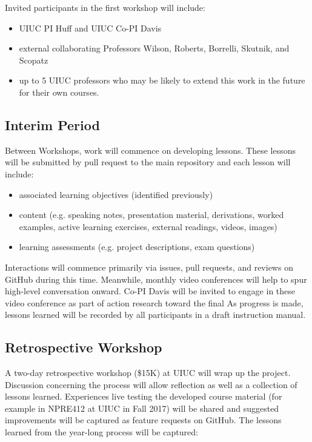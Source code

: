 \documentclass[11pt]{article}
\begin{document}
          Invited participants in the first workshop will include:
          \begin{itemize}
                  \item UIUC PI Huff and UIUC Co-PI Davis
                  \item external collaborating Professors Wilson, Roberts, 
                          Borrelli, Skutnik, and Scopatz
                  \item up to 5 UIUC professors who may be likely to extend 
                          this work in the future for their own courses.
          \end{itemize}

          \subsection{Interim Period}
          Between Workshops, work will commence on developing 
          lessons. These lessons will be submitted by pull request to the main 
          repository and each lesson will include:
          \begin{itemize} 
                  \item associated learning objectives (identified previously)
                \item content (e.g. speaking notes, presentation material, 
                        derivations, worked examples, active learning  
                          exercises, external readings, videos, images)
                  \item learning assessments (e.g. project descriptions, exam questions) 
          \end{itemize} 

          Interactions will commence primarily via issues, pull requests, and 
          reviews on GitHub during this time. Meanwhile, monthly video 
          conferences will help to spur high-level conversation onward.
          Co-PI Davis will be invited to engage in these video conference as 
          part of action research toward the final 
          As progress is made, lessons learned will be recorded by all 
          participants in a draft instruction manual. 

          \subsection{Retrospective Workshop}
          A two-day retrospective workshop (\$15K) at UIUC will wrap up the 
          project. Discussion concerning the process will allow reflection as 
          well as a collection of lessons learned.
          Experiences live testing the developed course material (for example 
          in NPRE412 at UIUC in Fall 2017) will be shared and suggested 
          improvements will be captured as feature requests on GitHub.  
          The lessons learned from the year-long process will be captured:
          
\end{document}

